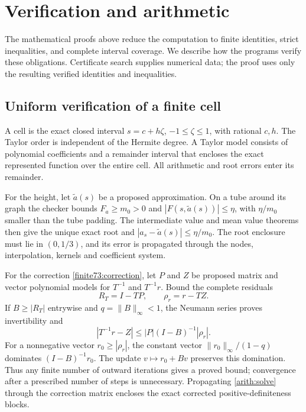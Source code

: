 \documentclass[12pt,reqno]{amsart}
\theoremstyle{definition}
\numberwithin{equation}{section}
\begin{document}
\section{Verification and arithmetic}\label{sec:arithmetic}
The mathematical proofs above reduce the computation to finite
identities, strict inequalities, and complete interval coverage.
We describe how the programs verify these obligations. Certificate
search supplies numerical data; the proof uses only the resulting
verified identities and inequalities.

\subsection{Uniform verification of a finite cell}
A cell is the exact closed interval $s=c+h\zeta$, $-1\le\zeta\le1$,
with rational $c,h$. The Taylor order is independent of the Hermite
degree. A Taylor model consists of polynomial coefficients and a
remainder interval that encloses the exact represented function over
the entire cell. All arithmetic and root errors enter its remainder.

For the height, let $\widetilde a(s)$ be a proposed approximation.
On a tube around its graph the checker bounds $F_a\ge m_0>0$ and
$|F(s,\widetilde a(s))|\le\eta$, with $\eta/m_0$ smaller than the
tube padding. The intermediate value and mean value theorems then
give the unique exact root and
$|a_s-\widetilde a(s)|\le\eta/m_0$.
The root enclosure must lie in $(0,1/3)$, and its error is propagated
through the nodes, interpolation, kernels and coefficient system.

For the correction \eqref{finite73:correction}, let $P$ and $Z$ be
proposed matrix and vector polynomial models for $T^{-1}$ and
$T^{-1}r$. Bound the complete residuals
\[
 R_T=I-TP,\qquad \rho_r=r-TZ.
\]
If $B\ge|R_T|$ entrywise and $q=\|B\|_\infty<1$, the Neumann series
proves invertibility and
\begin{equation}\label{arith:solve}
 |T^{-1}r-Z|\le |P|(I-B)^{-1}|\rho_r|.
\end{equation}
For a nonnegative vector $r_0\ge|\rho_r|$, the constant vector
$\|r_0\|_\infty/(1-q)$ dominates $(I-B)^{-1}r_0$.
The update $v\mapsto r_0+Bv$ preserves this domination. Thus any
finite number of outward iterations gives a proved bound; convergence
after a prescribed number of steps is unnecessary.
Propagating \eqref{arith:solve} through the correction matrix encloses
the exact corrected positive-definiteness blocks.
\end{document}
